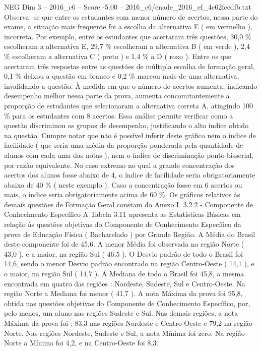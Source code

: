 \begin{textsample}{NEG Dim 3 – 2016\_c6 – Score -5.00 – 2016\_c6/enade\_2016\_ef\_4c62fccdfb.txt}
Observa -se que entre os estudantes com menor número de acertos, nessa parte do exame, a situação mais frequente foi a escolha da alternativa E ( em vermelho ), incorreta.
Por exemplo, entre os estudantes que acertaram três questões, 30,0 \% escolheram a alternativa E, 29,7 \% escolheram a alternativa B ( em verde ), 2,4 \% escolheram a alternativa C ( preto ) e 1,4 \% a D ( roxo ).
Entre os que acertaram três respostas entre as questões de múltipla escolha de formação geral, 0,1 \% deixou a questão em branco e 0,2 \% marcou mais de uma alternativa, invalidando a questão.
À medida em que o número de acertos aumenta, indicando desempenho melhor nessa parte da prova, aumenta concomitantemente a proporção de estudantes que selecionaram a alternativa correta A, atingindo 100 \% para os estudantes com 8 acertos.
Essa análise permite verificar como a questão discriminou os grupos de desempenho, justificando o alto índice obtido na questão.
Cumpre notar que não é possível inferir deste gráfico nem o índice de facilidade ( que seria uma média da proporção ponderada pela quantidade de alunos com cada uma das notas ), nem o índice de discriminação ponto-bisserial, por razão equivalente.
No caso extremo no qual a grande concentração dos acertos dos alunos fosse abaixo de 4, o índice de facilidade seria obrigatoriamente abaixo de 40 \% ( neste exemplo ).
Caso a concentração fosse em 6 acertos ou mais, o índice seria obrigatoriamente acima de 60 \%.
Os gráficos relativos às demais questões de Formação Geral constam do Anexo I. 3.2.2 - Componente de Conhecimento Específico A Tabela 3.11 apresenta as Estatísticas Básicas em relação às questões objetivas do Componente de Conhecimento Específico da prova de Educação Física ( Bacharelado ) por Grande Região.
A Média do Brasil deste componente foi de 45,6.
A menor Média foi observada na região Norte ( 43,0 ), e a maior, na região Sul ( 46,5 ).
O Desvio padrão de todo o Brasil foi 14,6, sendo o menor Desvio padrão encontrado na região Centro-Oeste ( 14,1 ), e o maior, na região Sul ( 14,7 ).
A Mediana de todo o Brasil foi 45,8, a mesma encontrada em quatro das regiões : Nordeste, Sudeste, Sul e Centro-Oeste.
Na região Norte a Mediana foi menor ( 41,7 ).
A nota Máxima da prova foi 95,8, obtida nas questões objetivas do Componente de Conhecimento Específico, por, pelo menos, um aluno nas regiões Sudeste e Sul.
Nas demais regiões, a nota Máxima da prova foi : 83,3 nas regiões Nordeste e Centro-Oeste e 79,2 na região Norte.
Nas regiões Nordeste, Sudeste e Sul, a nota Mínima foi zero.
Na região Norte a Mínima foi 4,2, e na Centro-Oeste foi 8,3.

\end{textsample}

